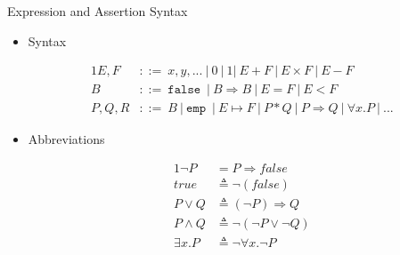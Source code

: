 \documentclass{beamer}
\newcommand{\mtt}[1]{
  \mathtt{#1}\;
}
\begin{document}
\begin{frame}{Expression and Assertion Syntax}
  \begin{itemize}
    \item {
      Syntax

      \begin{alignat*}{1}
        E, F &::=\ x, y, ...\ |\ 0\ |\ 1 |\ E + F\ |\ E \times F\ |\ E - F \\
        B &::=\ \mtt{false}\ |\ B \Rightarrow B\ |\ E = F\ |\ E < F \\
        P, Q, R &::=\ B\ |\ \mtt{emp}\ |\ E \mapsto F\ |\ P * Q\ |\ P \Rightarrow Q\ |\ \forall x.P\ |\ ...
      \end{alignat*}
    }

    \item {
      Abbreviations

      \begin{alignat*}{1}
        \neg P &= P \Rightarrow false\\
        true &\triangleq \neg(false)\\
        P \lor Q &\triangleq (\neg P) \Rightarrow Q\\
        P \land Q &\triangleq \neg (\neg P \lor \neg Q)\\
        \exists x. P &\triangleq \neg \forall x.\neg P \\
      \end{alignat*}
    }
  \end{itemize}
\end{frame}
\end{document}
